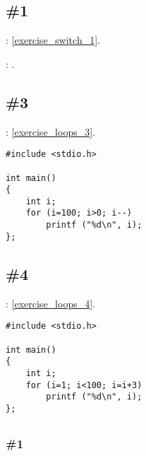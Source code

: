 \subsection{\Exercise \#1}
\label{exercise_solutions_switch_1}

\Exercise: \ref{exercise_switch_1}.

: \printf {}.

\subsection{}

\subsection{\Exercise \#3}
\label{exercise_solutions_loops_3}

\Exercise: \ref{exercise_loops_3}.

\begin{lstlisting}
#include <stdio.h>

int main()
{
	int i;
	for (i=100; i>0; i--)
		printf ("%d\n", i);
};
\end{lstlisting}

\subsection{\Exercise \#4}
\label{exercise_solutions_loops_4}

\Exercise: \ref{exercise_loops_4}.

\begin{lstlisting}
#include <stdio.h>

int main()
{
	int i;
	for (i=1; i<100; i=i+3)
		printf ("%d\n", i);
};
\end{lstlisting}

\subsection{}

\subsubsection{\Exercise \#1}
\label{exercise_solutions_strlen_1}

